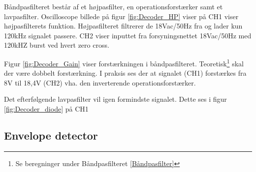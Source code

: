 Båndpasfilteret består af et højpasfilter, en operationsforstærker samt et lavpasfilter. 
Oscilloscope billede på figur \ref{fig:Decoder_HP} viser på CH1 viser højpasfilterets funktion. Højpasfilteret filtrerer de 18Vac/50Hz fra og lader kun 120kHz signalet passere. CH2 viser inputtet fra forsyningsnettet 18Vac/50Hz med 120kHZ burst ved hvert zero cross.

Figur \ref{fig:Decoder_Gain} viser forstærkningen i båndpasfilteret. Teoretisk\footnote{Se beregninger under Båndpasfilteret \ref{Båndpasfilter}} skal der være dobbelt forstærkning. I praksis ses der at signalet (CH1) forstærkes fra 8V til 18,4V (CH2) vha. den inverterende operationsforstærker.

Det efterfølgende lavpasfilter vil igen formindste signalet. Dette ses i figur \ref{fig:Decoder_diode} på CH1 


\subsection{Envelope detector}


